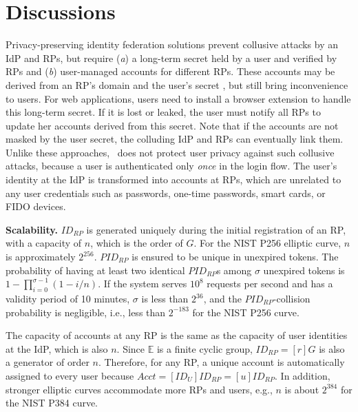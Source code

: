 \section{Discussions}
\label{sec:discussion}

Privacy-preserving identity federation solutions \cite{ELPASSO, UnlimitID, idemix, PseudoID, Opaak, uprov}
 prevent collusive attacks by an IdP and RPs,
 but require (\emph{a}) a long-term secret held by a user and verified by RPs
  and (\emph{b}) user-managed accounts \cite{PseudoID} for different RPs.
These accounts may be derived from an RP's domain and the user's secret \cite{ELPASSO, UnlimitID, Opaak, uprov,idemix},
 but still bring inconvenience to users.
For web applications, users need to install a browser extension to handle this long-term secret.
If it is lost or leaked, the user must notify all RPs to update her accounts derived from this secret.
Note that if the accounts are not masked by the user secret, the colluding IdP and RPs can eventually link them.
Unlike these approaches, \usso\ does not protect user privacy against such collusive attacks,
 because a user is authenticated only \emph{once} in the login flow.
 The user's identity at the IdP is transformed into accounts at RPs,
  which are unrelated to any user credentials such as passwords, one-time passwords, smart cards, or FIDO devices.

\vspace{0.75mm}
\noindent \textbf{Scalability.} $ID_{RP}$ is generated uniquely during the initial registration of an RP,
 with a capacity of $n$, which is the order of $G$. For the NIST P256 elliptic curve, $n$ is approximately $2^{256}$.
$PID_{RP}$ is ensured to be unique in unexpired tokens.
The probability of having at least two identical $PID_{RP}$s among $\sigma$ unexpired tokens is $1-\prod_{i=0}^{\sigma-1}(1-i/n)$.
If the system serves $10^{8}$ requests per second and has a validity period of 10 minutes, $\sigma$ is less than $2^{36}$,
 and the $PID_{RP}$-collision probability is negligible, i.e., less than $2^{-183}$ for the NIST P256 curve.

The capacity of accounts at any RP is the same as the capacity of user identities at the IdP,
 which is also $n$. Since $\mathbb{E}$ is a finite cyclic group, $ID_{RP} = [r]G$ is also a generator of order $n$.
 Therefore, for any RP, a unique account is automatically assigned to every user because $Acct =  [ID_U]ID_{RP} = [u]ID_{RP}$.
In addition, stronger elliptic curves accommodate more RPs and users, e.g., $n$ is about $2^{384}$ for the NIST P384 curve.


